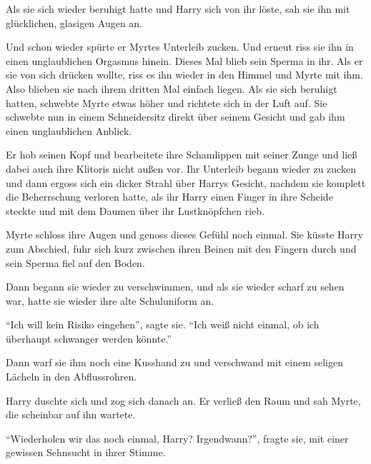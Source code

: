 Als sie sich wieder beruhigt hatte und Harry sich von ihr löste, sah sie ihn mit glücklichen, glasigen Augen an.

\begin{abAchtzehn}
Und schon wieder spürte er Myrtes Unterleib zucken. Und erneut riss sie ihn in einen unglaublichen Orgasmus hinein. Dieses Mal blieb sein Sperma in ihr. Als er sie von sich drücken wollte, riss es ihn wieder in den Himmel und Myrte mit ihm. Also blieben sie nach ihrem dritten Mal einfach liegen. Als sie sich beruhigt hatten, schwebte Myrte etwas höher und richtete sich in der Luft auf. Sie schwebte nun in einem Schneidersitz direkt über seinem Gesicht und gab ihm einen unglaublichen Anblick.

Er hob seinen Kopf und bearbeitete ihre Schamlippen mit seiner Zunge und ließ dabei auch ihre Klitoris nicht außen vor. Ihr Unterleib begann wieder zu zucken und dann ergoss sich ein dicker Strahl über Harrys Gesicht, nachdem sie komplett die Beherrschung verloren hatte, als ihr Harry einen Finger in ihre Scheide steckte und mit dem Daumen über ihr Lustknöpfchen rieb.

Myrte schloss ihre Augen und genoss dieses Gefühl noch einmal. Sie küsste Harry zum Abschied, fuhr sich kurz zwischen ihren Beinen mit den Fingern durch und sein Sperma fiel auf den Boden.
\end{abAchtzehn}

\begin{safedivide}
\fskdivider
\end{safedivide}

Dann begann sie wieder zu verschwimmen, und als sie wieder scharf zu sehen war, hatte sie wieder ihre alte Schuluniform an.

\begin{abAchtzehn}
\enquote{Ich will kein Risiko eingehen}, sagte sie. \enquote{Ich weiß nicht einmal, ob ich überhaupt schwanger werden könnte.} 
\end{abAchtzehn}


Dann warf sie ihm noch eine Kusshand zu und verschwand mit einem seligen Lächeln in den Abflussrohren.

Harry duschte sich und zog sich danach an. Er verließ den Raum und sah Myrte, die scheinbar auf ihn wartete.

\enquote{Wiederholen wir das noch einmal, Harry? Irgendwann?}, fragte sie, mit einer gewissen Sehnsucht in ihrer Stimme.

